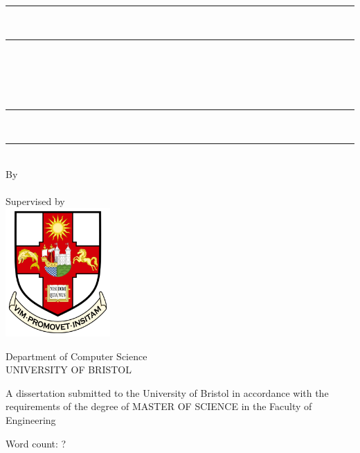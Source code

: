 \begin{titlepage}
    \centering
    
    \rule{\textwidth}{2pt} \\[-0.4ex] 
    \rule{\textwidth}{0.5pt} \\[1cm] 
    
    {\LARGE\bfseries \myReportTitle} \\[0.5cm]
    
    \parbox{0.89\textwidth}{\centering
    {\large \myReportSubtitle}
    } \\[0.5cm]
    
    \rule{\textwidth}{0.5pt} \\[-0.4ex] 
    \rule{\textwidth}{2pt} \\[1cm]   
    
    {\large By} \\[0.5cm]
    {\large \myName} \\[1cm]
    {\large Supervised by \mySupervisor} \\[1.5cm]
    
    \includegraphics[width=0.3\textwidth]{contents/0-preamble/fig00/uob_logo.png} \\[1.5cm]
    
    \begin{minipage}{0.6\textwidth} %
        \centering
        {\Large Department of Computer Science} \\[0.5cm]
        {\Large UNIVERSITY OF BRISTOL} \\[1cm]
        \begin{flushleft}
        {\normalsize A dissertation submitted to the University of Bristol in accordance with the requirements of the degree of MASTER OF SCIENCE in the Faculty of Engineering} \\[1cm]
        \end{flushleft}
        {\large \mySubmissionMonthYear}
    \end{minipage}
    \vfill

    \vspace{1cm}
    \begin{flushright}
        Word count: ?
    \end{flushright}

\end{titlepage}